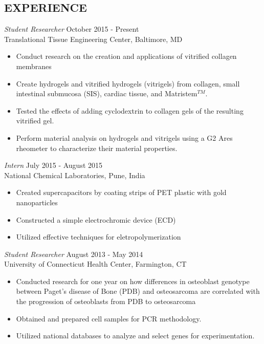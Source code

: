 \documentclass[line, 10pt]{res} %
\begin{document}
\begin{resume}
 
\section{EXPERIENCE}

{\sl Student Researcher} \hfill October 2015 - Present \\
Translational Tissue Engineering Center, Baltimore, MD
\begin{itemize}
\item Conduct research on the creation and applications of vitrified collagen membranes
\item Create hydrogels and vitrified hydrogels (vitrigels) from collagen, small intestinal submucosa (SIS), cardiac tissue, and Matristem$^{TM}$.
\item Tested the effects of adding cyclodextrin to collagen gels of the resulting vitrified gel.
\item Perform material analysis on hydrogels and vitrigels using a G2 Ares rheometer to characterize their material properties.
\end{itemize}

{\sl Intern} \hfill July 2015 - August 2015\\
National Chemical Laboratories, Pune, India
\begin{itemize}
\item Created supercapacitors by coating strips of PET plastic with gold nanoparticles 
\item Constructed a simple electrochromic device (ECD) 
\item Utilized effective techniques for eletropolymerization 
\end{itemize} 
 
{\sl Student Researcher} \hfill August 2013 - May 2014\\
University of Connecticut Health Center, Farmington, CT
\begin{itemize}
\item Conducted research for one year on how differences in osteoblast genotype between Paget’s disease of Bone (PDB) and osteosarcoma are correlated with the progression of osteoblasts from PDB to osteosarcoma
\item Obtained and prepared cell samples for PCR methodology.
\item Utilized national databases to analyze and select genes for experimentation.
\end{itemize} 


\end{resume}
\end{document}
